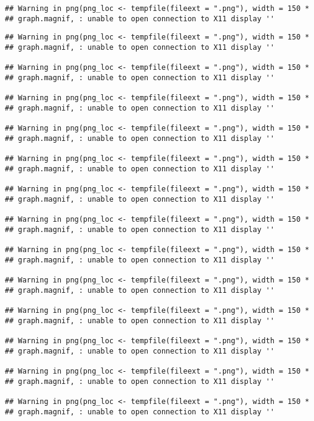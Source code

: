 \documentclass[]{article}
\begin{document}
\begin{verbatim}
## Warning in png(png_loc <- tempfile(fileext = ".png"), width = 150 *
## graph.magnif, : unable to open connection to X11 display ''
\end{verbatim}

\begin{verbatim}
## Warning in png(png_loc <- tempfile(fileext = ".png"), width = 150 *
## graph.magnif, : unable to open connection to X11 display ''

## Warning in png(png_loc <- tempfile(fileext = ".png"), width = 150 *
## graph.magnif, : unable to open connection to X11 display ''

## Warning in png(png_loc <- tempfile(fileext = ".png"), width = 150 *
## graph.magnif, : unable to open connection to X11 display ''

## Warning in png(png_loc <- tempfile(fileext = ".png"), width = 150 *
## graph.magnif, : unable to open connection to X11 display ''

## Warning in png(png_loc <- tempfile(fileext = ".png"), width = 150 *
## graph.magnif, : unable to open connection to X11 display ''

## Warning in png(png_loc <- tempfile(fileext = ".png"), width = 150 *
## graph.magnif, : unable to open connection to X11 display ''

## Warning in png(png_loc <- tempfile(fileext = ".png"), width = 150 *
## graph.magnif, : unable to open connection to X11 display ''

## Warning in png(png_loc <- tempfile(fileext = ".png"), width = 150 *
## graph.magnif, : unable to open connection to X11 display ''

## Warning in png(png_loc <- tempfile(fileext = ".png"), width = 150 *
## graph.magnif, : unable to open connection to X11 display ''

## Warning in png(png_loc <- tempfile(fileext = ".png"), width = 150 *
## graph.magnif, : unable to open connection to X11 display ''

## Warning in png(png_loc <- tempfile(fileext = ".png"), width = 150 *
## graph.magnif, : unable to open connection to X11 display ''

## Warning in png(png_loc <- tempfile(fileext = ".png"), width = 150 *
## graph.magnif, : unable to open connection to X11 display ''

## Warning in png(png_loc <- tempfile(fileext = ".png"), width = 150 *
## graph.magnif, : unable to open connection to X11 display ''


\end{verbatim}
\end{document}
